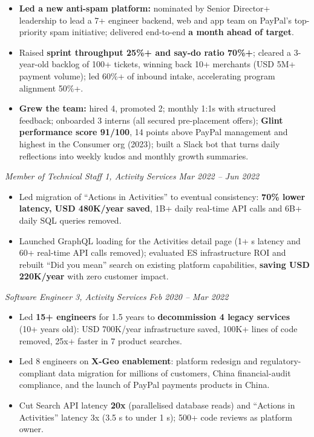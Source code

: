 \documentclass[10pt,a4paper]{article}
\newcommand{\bd}[1]{\textbf{#1}}
\newcommand{\role}[2]{%
  \par\vspace{2pt}\noindent\textcolor{rolecolor}{\textit{#1}}\hfill
  \textcolor{rolecolor}{\textit{#2}}\par\nopagebreak}
\begin{document}
\begin{itemize}
  performance 20\%+.
\item \bd{Led a new anti-spam platform:} nominated by Senior Director+ leadership to lead a 7+
  engineer backend, web and app team on PayPal's top-priority spam initiative; delivered
  end-to-end \bd{a month ahead of target}.
\item Raised \bd{sprint throughput 25\%+ and say-do ratio 70\%+}; cleared a 3-year-old backlog
  of 100+ tickets, winning back 10+ merchants (USD 5M+ payment volume); led 60\%+ of inbound
  intake, accelerating program alignment 50\%+.
\item \bd{Grew the team:} hired 4, promoted 2; monthly 1:1s with structured feedback; onboarded
  3 interns (all secured pre-placement offers); \bd{Glint performance score 91/100}, 14 points
  above PayPal management and highest in the Consumer org (2023); built a Slack bot that turns daily reflections into
  weekly kudos and monthly growth summaries.
\end{itemize}

\role{Member of Technical Staff 1, Activity Services}{Mar 2022 -- Jun 2022}
\begin{itemize}
\item Led migration of ``Actions in Activities'' to eventual consistency: \bd{70\% lower
  latency, USD 480K/year saved}, 1B+ daily real-time API calls and 6B+ daily SQL queries removed.
\item Launched GraphQL loading for the Activities detail page (1+ s latency and 60+ real-time
  API calls removed); evaluated ES infrastructure ROI and rebuilt ``Did you mean'' search on
  existing platform capabilities, \bd{saving USD 220K/year} with zero customer impact.
\end{itemize}

\role{Software Engineer 3, Activity Services}{Feb 2020 -- Mar 2022}
\begin{itemize}
\item Led \bd{15+ engineers} for 1.5 years to \bd{decommission 4 legacy services} (10+ years
  old): USD 700K/year infrastructure saved, 100K+ lines of code removed, 25x+ faster in 7
  product searches.
\item Led 8 engineers on \bd{X-Geo enablement}: platform redesign and regulatory-compliant data
  migration for millions of customers, China financial-audit compliance, and the launch of
  PayPal payments products in China.
\item Cut Search API latency \bd{20x} (parallelised database reads) and ``Actions in
  Activities'' latency 3x (3.5 s to under 1 s); 500+ code reviews as platform owner.
\end{itemize}
\end{document}
